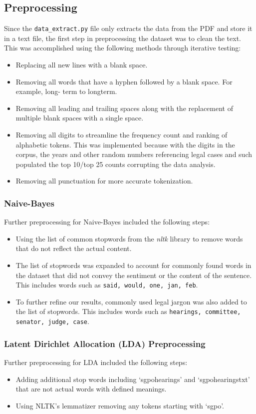 \documentclass[titlepage]{article}
\begin{document}
\subsection{Preprocessing}
Since the \texttt{data\_extract.py} file only extracts the data from the PDF and store it in a text file, 
the first step in preprocessing the dataset was to clean the text. This was accomplished using the following 
methods through iterative testing:
\begin{itemize}
    \item Replacing all new lines with a blank space.
    \item Removing all words that have a hyphen followed by a blank space. For example, long- term to longterm.
    \item Removing all leading and trailing spaces along with the replacement of multiple blank spaces with a single space.
    \item Removing all digits to streamline the frequency count and ranking of alphabetic tokens. This was implemented 
    because with the digits in the corpus, the years and other random numbers referencing legal cases and such populated the 
    top 10/top 25 counts corrupting the data analysis.
    \item Removing all punctuation for more accurate tokenization.
\end{itemize}

\subsubsection{Naive-Bayes}
Further preprocessing for Naive-Bayes included the following steps:
\begin{itemize}
    \item Using the list of common stopwords from the \textsl{nltk} library to remove words that do not reflect the 
    actual content.
    \item The list of stopwords was expanded to account for commonly found words in the dataset that did not convey the 
    sentiment or the content of the sentence. This includes words such as \texttt{said, would, one, jan, feb}.
    \item To further refine our results, commonly used legal jargon was also added to the list of stopwords. This includes
    words such as \texttt{hearings, committee, senator, judge, case}.
\end{itemize}

\subsubsection{Latent Dirichlet Allocation (LDA) Preprocessing}
Further preprocessing for LDA included the following steps:
\begin{itemize}
    \item Adding additional stop words including `sgpohearings' and `sgpohearingstxt' that are not actual words with defined meanings.
    \item Using NLTK's lemmatizer removing any tokens starting with `sgpo'.
\end{itemize}
\end{document}
